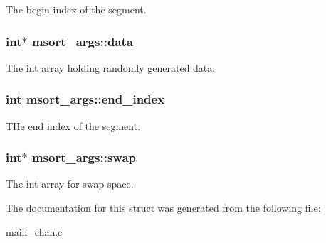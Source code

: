 The begin index of the segment. 

\hypertarget{structmsort__args_a20fc91c94125858e1d7c0178fa95b225}{
\subsubsection[{data}]{\setlength{\rightskip}{0pt plus 5cm}int$\ast$ msort\+\_\+args\+::data}}\label{structmsort__args_a20fc91c94125858e1d7c0178fa95b225}


The int array holding randomly generated data. 

\hypertarget{structmsort__args_a509e9dbf758788d6eb0604ab5ed6f6e3}{
\subsubsection[{end\+\_\+index}]{\setlength{\rightskip}{0pt plus 5cm}int msort\+\_\+args\+::end\+\_\+index}}\label{structmsort__args_a509e9dbf758788d6eb0604ab5ed6f6e3}


T\+He end index of the segment. 

\hypertarget{structmsort__args_aff28cf75b66fcdfd905e3de0c63c6044}{
\subsubsection[{swap}]{\setlength{\rightskip}{0pt plus 5cm}int$\ast$ msort\+\_\+args\+::swap}}\label{structmsort__args_aff28cf75b66fcdfd905e3de0c63c6044}


The int array for swap space. 



The documentation for this struct was generated from the following file\+:\begin{DoxyCompactItemize}
\item 
\hyperlink{main__chan_8c}{main\+\_\+chan.\+c}\end{DoxyCompactItemize}
